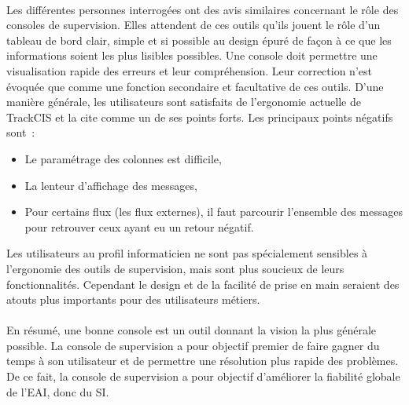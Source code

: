 			\paragraph{}%
			Les différentes personnes interrogées ont des avis similaires concernant le
			rôle des consoles de supervision. Elles attendent
			de ces outils qu’ils jouent le rôle d'un tableau de bord clair, simple et si
			possible au design épuré de façon à ce que les informations soient les plus
			lisibles possibles. Une console doit permettre une visualisation rapide des
			erreurs et leur compréhension. Leur correction n’est évoquée que comme une
			fonction secondaire et facultative de ces outils.\newline
			D’une manière générale, les utilisateurs sont satisfaits de l’ergonomie
			actuelle de TrackCIS et la cite comme un de ses points forts.
			Les principaux points négatifs sont~:
			\begin{itemize}
			  \item Le paramétrage des colonnes est difficile,
			  \item La lenteur d’affichage des messages,
			  \item Pour certains flux  (les flux externes), il faut parcourir l'ensemble
			  des messages pour retrouver ceux ayant eu un retour négatif.
			\end{itemize}
			Les utilisateurs au profil informaticien ne sont pas spécialement sensibles
			à l’ergonomie des outils de supervision, mais sont plus soucieux de leurs
			fonctionnalités. Cependant le design et de la facilité de prise en main
			seraient des atouts plus importants pour des utilisateurs métiers.
			
			\paragraph{}%
			En résumé, une bonne console est un outil donnant la vision la plus générale
			possible. La console de supervision a pour objectif premier de faire gagner
			du temps à son utilisateur et de permettre une résolution plus rapide des
			problèmes. De ce fait, la console de supervision a pour objectif d’améliorer
			la fiabilité globale de l’EAI, donc du SI.
			
